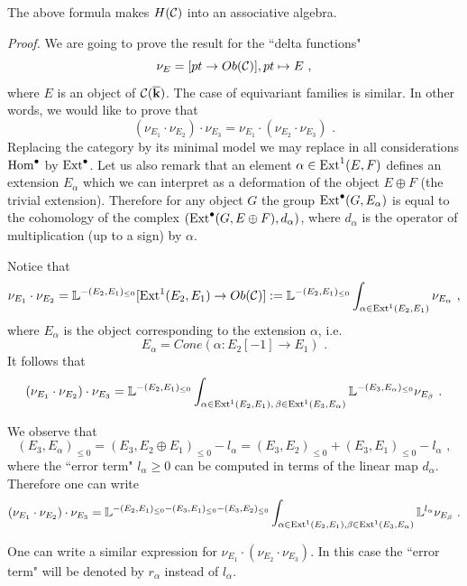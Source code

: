 \documentclass[12pt]{article}
\begin{document}
\begin{prp} The above formula makes $H({\mathcal C})$ into an associative algebra.

\end{prp}
{\it Proof.} We are going to prove the result for the ``delta functions" 
$$\nu_E=[pt\to Ob({\mathcal C})], pt\mapsto E\,\,,$$ where $E$ is an object of ${\mathcal C}({\overline{\bf k}})$. The case of equivariant families is similar. In other words, we would like to prove that
$$(\nu_{E_1}\cdot\nu_{E_2})\cdot \nu_{E_3}=\nu_{E_1}\cdot(\nu_{E_2}\cdot \nu_{E_3})\,\,.$$ 
 Replacing the category by its minimal model we may replace in all considerations $\operatorname{Hom}^{\bullet}$ by $\operatorname{Ext}^{\bullet}$. Let us also remark that an element $\alpha\in \operatorname{Ext}^1(E,F)$ defines an extension $E_{\alpha}$ which we can interpret as a deformation of the object $E\oplus F$ (the trivial extension). Therefore for any object $G$ the group $\operatorname{Ext}^{\bullet}(G,E_{\alpha})$ is equal to the cohomology of the complex $(\operatorname{Ext}^{\bullet}(G,E\oplus F),d_{\alpha})$, where $d_{\alpha}$ is the operator of multiplication (up to a sign) by $\alpha$.


Notice that
$$\nu_{E_1}\cdot\nu_{E_2}={\mathbb L}^{-(E_2,E_1)_{\le 0}}[\operatorname{Ext}^1(E_2,E_1)\to Ob({\mathcal C})]:={\mathbb L}^{-(E_2,E_1)_{\le 0}}\int_{\alpha\in \operatorname{Ext}^1(E_2,E_1)}\nu_{E_{\alpha}}\,\,,$$
where $E_{\alpha}$ is the object corresponding to the extension $\alpha$, i.e. 
$$E_{\alpha}=Cone(\alpha: E_2[-1]\to E_1)\,\,.$$
It follows that
$$(\nu_{E_1}\cdot\nu_{E_2})\cdot \nu_{E_3}={\mathbb L}^{-(E_2,E_1)_{\le 0}}\int_{
\alpha\in \operatorname{Ext}^1(E_2,E_1),\,\beta\in \operatorname{Ext}^1(E_3,E_{\alpha}) }{\mathbb L}^{-(E_3,E_{\alpha})_{\le 0}}\nu_{E_{\beta}}\,\,.$$

We observe that $$(E_3,E_{\alpha})_{\le 0}=(E_3,E_2\oplus E_1)_{\le 0}-l_{\alpha}=(E_3,E_2)_{\le 0}+ (E_3,E_1)_{\le 0}-l_{\alpha}\,\,,$$
 where the ``error term" $l_{\alpha}\geqslant 0$ can be computed in terms of the linear map $d_{\alpha}$.
Therefore one can write
$$(\nu_{E_1}\cdot\nu_{E_2})\cdot \nu_{E_3}={\mathbb L}^{-(E_2,E_1)_{\le 0}-(E_3,E_1)_{\le 0}-(E_3,E_2)_{\le 0}}\int_{\alpha\in \operatorname{Ext}^1(E_2,E_1),\beta\in \operatorname{Ext}^1(E_3,E_{\alpha})}{\mathbb L}^{l_{\alpha}}\nu_{E_{\beta}}\,\,.$$

One can write a similar expression for $\nu_{E_1}\cdot(\nu_{E_2}\cdot \nu_{E_3})$. In this case the ``error term"  will be denoted by $r_{\alpha}$ instead of $l_{\alpha}$.
\end{document}
